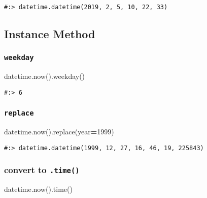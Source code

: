 \documentclass[
]{book}
\newenvironment{Shaded}{\begin{snugshade}}{\end{snugshade}}
\newcommand{\DecValTok}[1]{\textcolor[rgb]{0.06,0.06,0.06}{#1}}
\newcommand{\NormalTok}[1]{#1}
\newcommand{\OperatorTok}[1]{\textcolor[rgb]{0.43,0.43,0.43}{\textbf{#1}}}
\begin{document}
\begin{verbatim}
#:> datetime.datetime(2019, 2, 5, 10, 22, 33)
\end{verbatim}

\hypertarget{instance-method-1}{%
\subsection{Instance Method}\label{instance-method-1}}

\hypertarget{weekday}{%
\subsubsection{\texorpdfstring{\texttt{weekday}}{weekday}}\label{weekday}}

\begin{Shaded}
\begin{Highlighting}[]
\NormalTok{datetime.now().weekday()}
\end{Highlighting}
\end{Shaded}

\begin{verbatim}
#:> 6
\end{verbatim}

\hypertarget{replace-1}{%
\subsubsection{\texorpdfstring{\texttt{replace}}{replace}}\label{replace-1}}

\begin{Shaded}
\begin{Highlighting}[]
\NormalTok{datetime.now().replace(year}\OperatorTok{=}\DecValTok{1999}\NormalTok{)}
\end{Highlighting}
\end{Shaded}

\begin{verbatim}
#:> datetime.datetime(1999, 12, 27, 16, 46, 19, 225843)
\end{verbatim}

\hypertarget{convert-to-.time}{%
\subsubsection{\texorpdfstring{convert to \texttt{.time()}}{convert to .time()}}\label{convert-to-.time}}

\begin{Shaded}
\begin{Highlighting}[]
\NormalTok{datetime.now().time()}
\end{Highlighting}
\end{Shaded}
\end{document}
